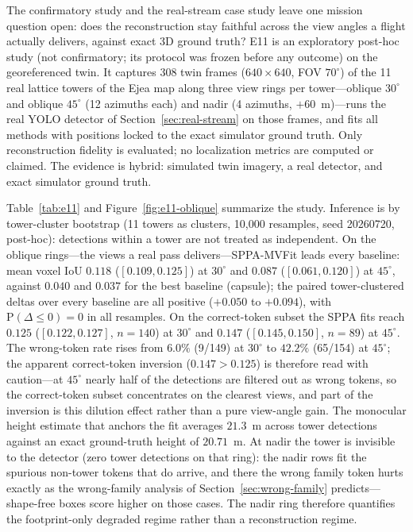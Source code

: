 \documentclass[11pt,a4paper]{article}
\begin{document}
The confirmatory study and the real-stream case study leave one mission
question open: does the reconstruction stay faithful across the view angles
a flight actually delivers, against exact 3D ground truth? E11 is an
exploratory post-hoc study (not confirmatory; its protocol was frozen before
any outcome) on the georeferenced twin. It captures 308 twin frames
(\(640{\times}640\), FOV \(70^{\circ}\)) of the 11 real lattice towers of the
Ejea map along three view rings per tower---oblique \(30^{\circ}\) and
oblique \(45^{\circ}\) (12 azimuths each) and nadir (4 azimuths, \(+60\)~m)---runs the real YOLO detector of
Section~\ref{sec:real-stream} on those frames, and fits all methods with
positions locked to the exact simulator ground truth. Only reconstruction
fidelity is evaluated; no localization metrics are computed or claimed. The
evidence is hybrid: simulated twin imagery, a real
detector, and exact simulator ground truth.

Table~\ref{tab:e11} and Figure~\ref{fig:e11-oblique} summarize the study.
Inference is by tower-cluster bootstrap (11 towers as clusters, 10{,}000
resamples, seed 20260720, post-hoc): detections within a tower are not
treated as independent. On
the oblique rings---the views a real pass delivers---SPPA-MVFit leads every
baseline: mean voxel IoU \(0.118\)
(\([0.109,0.125]\)) at \(30^{\circ}\) and \(0.087\) (\([0.061,0.120]\)) at
\(45^{\circ}\), against \(0.040\) and \(0.037\) for the best baseline
(capsule); the paired tower-clustered deltas over every baseline are all
positive (\(+0.050\) to \(+0.094\)), with \(\mathrm{P}(\Delta\leq 0)=0\) in
all resamples. On the correct-token subset the SPPA fits reach
\(0.125\) (\([0.122,0.127]\), \(n{=}140\)) at \(30^{\circ}\) and \(0.147\)
(\([0.145,0.150]\), \(n{=}89\)) at \(45^{\circ}\). The wrong-token rate rises
from \(6.0\%\) (9/149) at \(30^{\circ}\) to \(42.2\%\) (65/154) at
\(45^{\circ}\); the apparent correct-token inversion (\(0.147>0.125\)) is
therefore read with caution---at \(45^{\circ}\) nearly half of the detections
are filtered out as wrong tokens, so the correct-token subset concentrates
on the clearest views, and part of the inversion is this dilution effect
rather than a pure view-angle gain. The monocular height estimate that anchors the fit
averages \(21.3\)~m across tower detections against an exact ground-truth
height of \(20.71\)~m. At nadir the tower is invisible to the detector
(zero tower detections on that ring): the nadir rows fit the spurious
non-tower tokens that do arrive, and there the wrong family token hurts
exactly as the wrong-family analysis of Section~\ref{sec:wrong-family}
predicts---shape-free boxes score higher on those cases. The nadir ring
therefore quantifies the footprint-only degraded regime rather than a
reconstruction regime.
\end{document}

